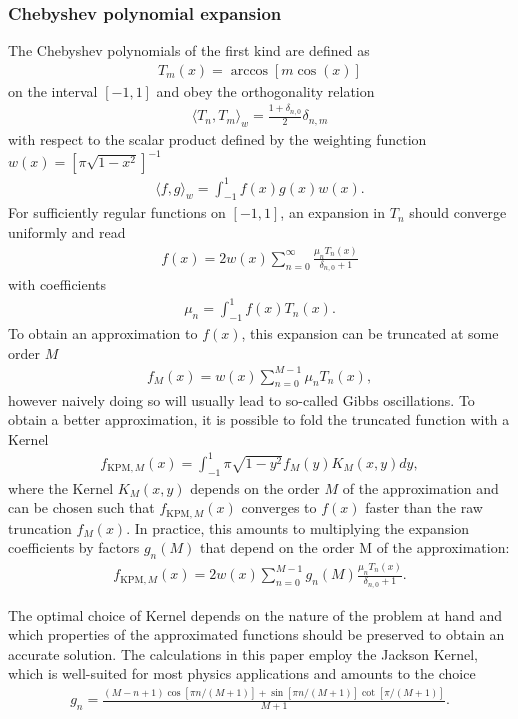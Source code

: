 \documentclass[aps,prl,amsmath,amssymb,twocolumn]{revtex4-2}
\begin{document}
\subsubsection{Chebyshev polynomial expansion}
The Chebyshev polynomials of the first kind are defined as
\begin{align}
T_m(x) = \arccos[m \cos(x)]
\end{align}
on the interval $[-1, 1]$ and obey the orthogonality relation
\begin{align}
\langle T_n , T_m \rangle_w = \frac{1 + \delta_{n,0}}{2} \delta_{n,m}
\end{align}
with respect to the scalar product defined by the weighting function $w(x) = [\pi \sqrt{1-x^2}]^{-1}$
\begin{align}
\langle f , g \rangle_w = \int_{-1}^1 f(x) g(x) w(x).
\end{align}
For sufficiently regular functions on $[-1,1]$, an expansion in $T_n$ should converge uniformly and read
\begin{align}
f(x) = 2 w(x) \sum_{n = 0}^\infty \frac{\mu_n T_n(x)}{\delta_{n,0} + 1}
\end{align}
with coefficients
\begin{align}
\mu_n = \int_{-1}^1 f(x) T_n(x).
\end{align}
To obtain an approximation to $f(x)$, this expansion can be truncated at some order $M$
\begin{align}
f_M(x) = w(x)\sum_{n = 0}^{M-1} \mu_n T_n(x),
\end{align}
however naively doing so will usually lead to so-called Gibbs oscillations. To obtain a better approximation, it is possible to fold the truncated function with a Kernel
\begin{align}
f_{\text{KPM},M}(x) = \int_{-1}^1 \pi \sqrt{1 - y^2} f_M(y) K_M(x, y) dy,
\end{align} 
where the Kernel $K_M(x, y)$ depends on the order $M$ of the approximation and can be chosen such that $f_{\text{KPM},M}(x)$ converges to $f(x)$ faster than the raw truncation $f_M(x)$. In practice, this amounts to multiplying the expansion coefficients by factors $g_n(M)$ that depend on the order M of the approximation:
\begin{align}
f_{\text{KPM},M}(x) = 2 w(x) \sum_{n = 0}^{M-1} g_n(M) \frac{\mu_n T_n(x)}{\delta_{n,0} + 1}.
\end{align} 

The optimal choice of Kernel depends on the nature of the problem at hand and which properties of the approximated functions should be preserved to obtain an accurate solution. The calculations in this paper employ the Jackson Kernel, which is well-suited for most physics applications and amounts to the choice
\begin{align}
g_n = \frac{(M-n+1) \cos[\pi n / (M+1)] + \sin[\pi n / (M+1)] \cot[\pi / (M+1)]}{M+1}.
\end{align} 
\end{document}
